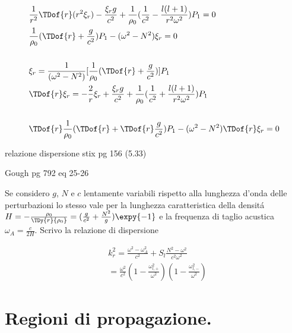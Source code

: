 \begin{align*}
&\frac{1}{r^2}\TDof{r}(r^2\xi_r)-\frac{\xi_rg}{c^2}+\frac{1}{\rho_0}(\frac{1}{c^2}-\frac{l(l+1)}{r^2\omega^2})P_1=0\\
&\frac{1}{\rho_0}(\TDof{r}+\frac{g}{c^2})P_1-(\omega^2-N^2)\xi_r=0\\
\\
&\xi_r=\frac{1}{(\omega^2-N^2)}[\frac{1}{\rho_0}(\TDof{r}+\frac{g}{c^2})]P_1\\
&\TDof{r}\xi_r=-\frac{2}{r}\xi_r+\frac{\xi_rg}{c^2}+\frac{1}{\rho_0}(\frac{1}{c^2}+\frac{l(l+1)}{r^2\omega^2})P_1\\
\\
&\TDof{r} \frac{1}{\rho_0}(\TDof{r}+\TDof{r} \frac{g}{c^2})P_1-(\omega^2-N^2)\TDof{r} \xi_r=0
\end{align*}

\begin{todo}{relazione dispersione stix pg 156 (5.33)}

Gough pg 792 eq 25-26

\end{todo}

Se considero $g$, $N$ e $c$ lentamente variabili rispetto alla lunghezza d'onda delle perturbazioni lo stesso vale per la lunghezza caratteristica della densit\'a $H=-\frac{\rho_0}{\TDy{r}{\rho_0}}=(\frac{g}{c^2}+\frac{N^2}{g})\expy{-1}$ e la frequenza di taglio acustica $\omega_A=\frac{c}{2H}$. Scrivo la relazione di dispersione

\begin{align}
&k_r^2=\frac{\omega^2-\omega_A^2}{c^2}+S_l\frac{N^2-\omega^2}{c^2\omega^2}\label{eq:localdispersion}\\
&=\frac{\omega^2}{c^2}(1-\frac{\omega_{l,+}^2}{\omega^2})(1-\frac{\omega_{l,-}^2}{\omega^2})\nonumber
\end{align}

\begin{comment}
\begin{figure}[!ht]
\centering
\texttt{[image: freqcaratt]}
\caption{Frequenze caratteristiche.}
\label{fig:freqcaratt}
\end{figure}
\end{comment}

\clearpage


\section{Regioni di propagazione.}

